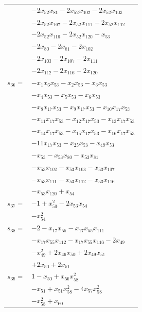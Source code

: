 \begin{longtable}{@{}r@{\;}l@{}}
 & \(\displaystyle -2x_{52}x_{81} -2x_{52}x_{102} -2x_{52}x_{103}\) \\
 & \(\displaystyle -2x_{52}x_{107} -2x_{52}x_{111} -2x_{52}x_{112}\) \\
 & \(\displaystyle -2x_{52}x_{116} -2x_{52}x_{120} +x_{53}\) \\
 & \(\displaystyle -2x_{80} -2x_{81} -2x_{102}\) \\
 & \(\displaystyle -2x_{103} -2x_{107} -2x_{111}\) \\
 & \(\displaystyle -2x_{112} -2x_{116} -2x_{120}\) \\[3pt]
\(s_{36}=\) & \(\displaystyle -x_{1}x_{6}x_{53} -x_{2}x_{53} -x_{3}x_{53}\) \\
 & \(\displaystyle -x_{4}x_{53} -x_{5}x_{53} -x_{6}x_{53}\) \\
 & \(\displaystyle -x_{8}x_{17}x_{53} -x_{9}x_{17}x_{53} -x_{10}x_{17}x_{53}\) \\
 & \(\displaystyle -x_{11}x_{17}x_{53} -x_{12}x_{17}x_{53} -x_{13}x_{17}x_{53}\) \\
 & \(\displaystyle -x_{14}x_{17}x_{53} -x_{15}x_{17}x_{53} -x_{16}x_{17}x_{53}\) \\
 & \(\displaystyle -11x_{17}x_{53} -x_{25}x_{53} -x_{49}x_{53}\) \\
 & \(\displaystyle -x_{53} -x_{53}x_{80} -x_{53}x_{81}\) \\
 & \(\displaystyle -x_{53}x_{102} -x_{53}x_{103} -x_{53}x_{107}\) \\
 & \(\displaystyle -x_{53}x_{111} -x_{53}x_{112} -x_{53}x_{116}\) \\
 & \(\displaystyle -x_{53}x_{120} +x_{54}\) \\[3pt]
\(s_{37}=\) & \(\displaystyle -1 +x_{50}^{2} -2x_{53}x_{54}\) \\
 & \(\displaystyle -x_{54}^{2}\) \\[3pt]
\(s_{38}=\) & \(\displaystyle -2 -x_{17}x_{55} -x_{17}x_{55}x_{111}\) \\
 & \(\displaystyle -x_{17}x_{55}x_{112} -x_{17}x_{55}x_{116} -2x_{49}\) \\
 & \(\displaystyle -x_{49}^{2} +2x_{49}x_{50} +2x_{49}x_{51}\) \\
 & \(\displaystyle +2x_{50} +2x_{51}\) \\[3pt]
\(s_{39}=\) & \(\displaystyle 1 -x_{50} +x_{50}x_{58}^{2}\) \\
 & \(\displaystyle -x_{51} +x_{51}x_{58}^{2} -4x_{57}x_{58}^{2}\) \\
 & \(\displaystyle -x_{58}^{2} +x_{60}\) \\[3pt]

\end{longtable}
